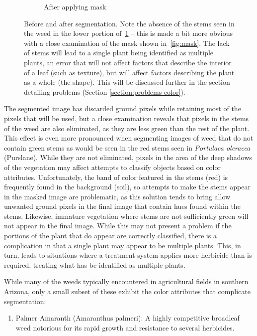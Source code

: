\documentclass[letterpaper]{report}
\begin{document}
{\begin{figure}[H]
\begin{subfigure}[h]{.30\textwidth}
	  \caption{After applying mask}
	  \label{fig:original-masked}
	\end{subfigure}
	\caption[Before and after segmentation]{Before and after segmentation. Note the absence of the stems seen in the weed in the lower portion of~\ref{fig:original-masked} -- this is made a bit more obvious with a close examination of the mask shown in~\ref{fig:mask}. The lack of stems will lead to a single plant being identified as multiple plants, an error that will not affect factors that describe the interior of a leaf (such as texture), but will affect factors describing the plant as a whole (the shape). This will be discussed further in the section detailing problems (Section \ref{section:problems-color}).}
	\label{fig:segmentation}
\end{figure}
The segmented image has discarded ground pixels while retaining most of the pixels that will be used, but a close examination reveals that pixels in the stems of the weed are also eliminated, as they are less green than the rest of the plant. This effect is even more pronounced when segmenting images of weed that do not contain green stems as would be seen in the red stems seen in \textit{Portulaca oleracea} (Purslane). While they are not eliminated, pixels in the area of the deep shadows of the vegetation may affect attempts to classify objects based on color attributes. Unfortunately, the band of color featured in the stems (red) is frequently found in the background (soil), so attempts to make the stems appear in the masked image are problematic, as this solution tends to bring allow unwanted ground pixels in the final image that contain hues found within the stems. Likewise, immature vegetation where stems are not sufficiently green will not appear in the final image.  While this may not present a problem if the portions of the plant that do appear are correctly classified, there is a complication in that a single plant may appear to be multiple plants. This, in turn, leads to situations where a treatment system applies more herbicide than is required, treating what has be identified as multiple plants.

While many of the weeds typically encountered in agricultural fields in southern Arizona, only a small subset of these exhibit the color attributes that complicate segmentation:
\begin{enumerate}
	\item{Palmer Amaranth (Amaranthus palmeri): A highly competitive broadleaf weed notorious for its rapid growth and resistance to several herbicides.}


\end{enumerate}}
\end{document}
